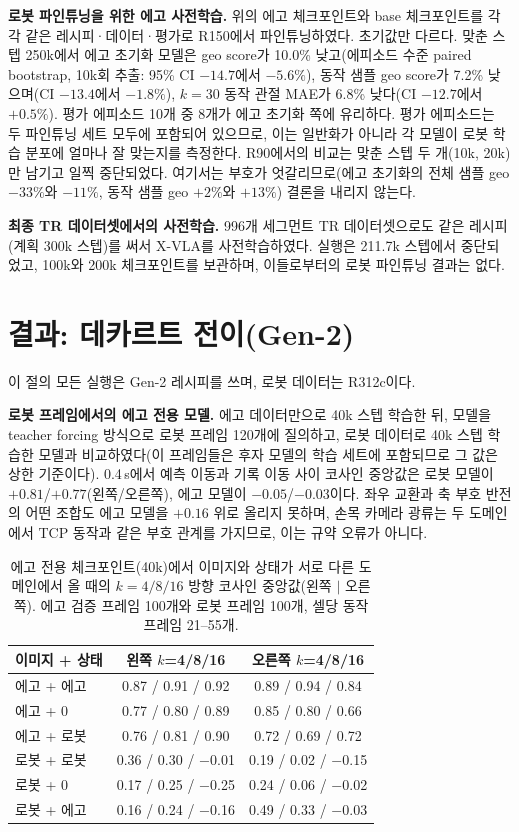 \documentclass[conference,10pt]{IEEEtran}
\begin{document}
\textbf{로봇 파인튜닝을 위한 에고 사전학습.} 위의 에고 체크포인트와 base 체크포인트를 각각 같은 레시피·데이터·평가로 R150에서
파인튜닝하였다. 초기값만 다르다. 맞춘 스텝 250k에서 에고 초기화 모델은 geo score가 10.0\% 낮고(에피소드 수준 paired bootstrap,
10k회 추출: 95\% CI $-14.7$에서 $-5.6\%$), 동작 샘플 geo score가 7.2\% 낮으며(CI $-13.4$에서 $-1.8\%$), $k{=}30$ 동작 관절 MAE가
6.8\% 낮다(CI $-12.7$에서 $+0.5\%$). 평가 에피소드 10개 중 8개가 에고 초기화 쪽에 유리하다. 평가 에피소드는 두 파인튜닝 세트 모두에
포함되어 있으므로, 이는 일반화가 아니라 각 모델이 로봇 학습 분포에 얼마나 잘 맞는지를 측정한다. R90에서의 비교는 맞춘 스텝 두
개(10k, 20k)만 남기고 일찍 중단되었다. 여기서는 부호가 엇갈리므로(에고 초기화의 전체 샘플 geo $-33\%$와 $-11\%$, 동작 샘플 geo
$+2\%$와 $+13\%$) 결론을 내리지 않는다.

\textbf{최종 TR 데이터셋에서의 사전학습.} 996개 세그먼트 TR 데이터셋으로도 같은 레시피(계획 300k 스텝)를 써서 X-VLA를
사전학습하였다. 실행은 211.7k 스텝에서 중단되었고, 100k와 200k 체크포인트를 보관하며, 이들로부터의 로봇 파인튜닝 결과는 없다.

\section{결과: 데카르트 전이(Gen-2)}\label{sec:res2}
이 절의 모든 실행은 Gen-2 레시피를 쓰며, 로봇 데이터는 R312c이다.

\textbf{로봇 프레임에서의 에고 전용 모델.} 에고 데이터만으로 40k 스텝 학습한 뒤, 모델을 teacher forcing 방식으로 로봇 프레임 120개에
질의하고, 로봇 데이터로 40k 스텝 학습한 모델과 비교하였다(이 프레임들은 후자 모델의 학습 세트에 포함되므로 그 값은 상한 기준이다).
0.4\,s에서 예측 이동과 기록 이동 사이 코사인 중앙값은 로봇 모델이 $+0.81$/$+0.77$(왼쪽/오른쪽), 에고 모델이 $-0.05$/$-0.03$이다.
좌우 교환과 축 부호 반전의 어떤 조합도 에고 모델을 $+0.16$ 위로 올리지 못하며, 손목 카메라 광류는 두 도메인에서 TCP 동작과 같은
부호 관계를 가지므로, 이는 규약 오류가 아니다.

\begin{table}[t]
\centering\footnotesize\setlength{\tabcolsep}{3.2pt}
\caption{에고 전용 체크포인트(40k)에서 이미지와 상태가 서로 다른 도메인에서 올 때의 $k{=}4/8/16$ 방향 코사인 중앙값(왼쪽 $|$ 오른쪽).
에고 검증 프레임 100개와 로봇 프레임 100개, 셀당 동작 프레임 21--55개.}
\label{tab:ablation}
\begin{tabular}{@{}lcc@{}}
\toprule
이미지 + 상태 & 왼쪽 $k$=4/8/16 & 오른쪽 $k$=4/8/16 \\
\midrule
에고 + 에고 & 0.87 / 0.91 / 0.92 & 0.89 / 0.94 / 0.84 \\
에고 + 0 & 0.77 / 0.80 / 0.89 & 0.85 / 0.80 / 0.66 \\
에고 + 로봇 & 0.76 / 0.81 / 0.90 & 0.72 / 0.69 / 0.72 \\
로봇 + 로봇 & 0.36 / 0.30 / $-$0.01 & 0.19 / 0.02 / $-$0.15 \\
로봇 + 0 & 0.17 / 0.25 / $-$0.25 & 0.24 / 0.06 / $-$0.02 \\
로봇 + 에고 & 0.16 / 0.24 / $-$0.16 & 0.49 / 0.33 / $-$0.03 \\
\bottomrule
\end{tabular}
\end{table}
\end{document}
